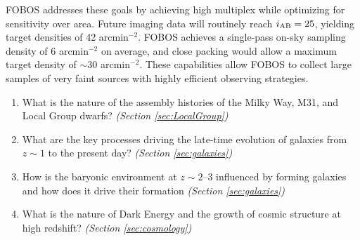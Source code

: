\documentclass[preprint,11pt]{aastex}
\begin{document}

FOBOS addresses these goals by achieving high multiplex while optimizing for sensitivity over area.  Future imaging
data will routinely reach $i_{\rm AB} = 25$, yielding target densities of 42 arcmin$^{-2}$.  FOBOS achieves a
single-pass on-sky sampling density of 6 arcmin$^{-2}$ on average, and close packing would allow a maximum target density of
$\sim$30 arcmin$^{-2}$.  These capabilities allow FOBOS to collect large samples of very faint sources with highly
efficient observing strategies.


\begin {enumerate} 

\item What is the nature of the assembly histories of the Milky Way, M31, and Local Group dwarfs?  {\em (Section
    \ref{sec:LocalGroup})}

\item What are the key processes driving the late-time evolution of galaxies from $z\sim 1$ to the present day? {\em (Section \ref{sec:galaxies})}

\item How is the baryonic environment at $z \sim 2$--3 influenced by forming galaxies and how does it drive their formation {\em (Section \ref{sec:galaxies})}

\item What is the nature of Dark Energy and the growth of cosmic structure at high redshift? {\em (Section \ref{sec:cosmology})}

\end {enumerate}
\end{document}
